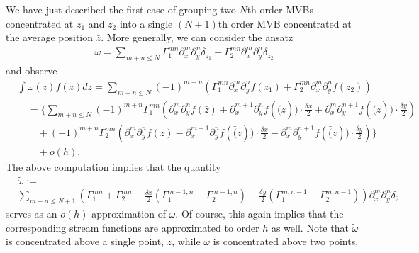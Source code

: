 \documentclass[12pt]{amsart}
\theoremstyle{remark}
\begin{document}
We have just described the first case of grouping two $N$th order MVBs concentrated at $z_1$ and $z_2$ into a single $(N+1)$th order MVB concentrated at 
the average position $\bar{z}$.
More generally, we can consider the ansatz
\begin{align*}
	\omega = \sum_{m+n \leq N} \Gamma_1^{mn} \partial_x^m \partial_y^n \delta_{z_1} + \Gamma_2^{mn} \partial_x^m \partial_y^n \delta_{z_2}
\end{align*}
and observe
\begin{align*}
	&\int \omega(z) f(z)dz = \sum_{m+n \leq N} (-1)^{m+n} \left( \Gamma_1^{mn} \partial_x^m \partial_y^n f(z_1) + \Gamma_2^{mn}  \partial_x^m \partial_y^n f(z_2) \right)\\
		&\quad= \Bigg\{ \sum_{m+n \leq N} (-1)^{m+n} \Gamma_1^{mn} \left( \partial_x^m \partial_y^n  f(\bar{z}) + \partial_x^{m+1} \partial_y^n  f(\bar(z)) \cdot \frac{\delta x}{2} + \partial_x^m \partial_y^{n+1} f(\bar(z)) \cdot \frac{\delta y}{2}  \right)\\
		&\qquad +  (-1)^{m+n} \Gamma_2^{mn} \left( \partial_x^m \partial_y^n  f(\bar{z}) - \partial_x^{m+1} \partial_y^n  f(\bar(z)) \cdot \frac{\delta x}{2} - \partial_x^m \partial_y^{n+1} f(\bar(z)) \cdot \frac{\delta y}{2}  \right) \Bigg\} \\
		&\qquad + o( h ) .
\end{align*}
The above computation implies that the quantity
\begin{align*}
	&\tilde{\omega} :=\\
	 &\sum_{m+n \leq N+1} \left( \Gamma_1^{mn} + \Gamma_2^{mn}
	- \frac{\delta x}{2}( \Gamma_1^{ m-1,n} - \Gamma_2^{m-1,n} ) - \frac{\delta y}{2} ( \Gamma_1^{m,n-1} - \Gamma_2^{m,n-1}) \right) \partial_x^m \partial_y^n \delta_{\bar{z}}
\end{align*}
serves as an $o(h)$ approximation of $\omega$.
Of course, this again implies that the corresponding stream functions are approximated to order $h$ as well.
Note that $\tilde{\omega}$ is concentrated above a single point, $\bar{z}$, while $\omega$ is concentrated above two points.
\end{document}
